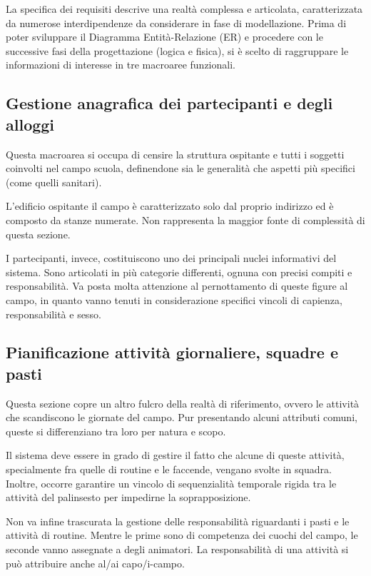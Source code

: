 \documentclass[11pt,a4paper]{article}
\begin{document}
La specifica dei requisiti descrive una realtà complessa e articolata, caratterizzata da
numerose interdipendenze da considerare in fase di modellazione. Prima di poter sviluppare il
Diagramma Entità-Relazione (ER) e procedere con le successive fasi della progettazione (logica
e fisica), si è scelto di raggruppare le informazioni di interesse in tre macroaree funzionali.

\subsection{Gestione anagrafica dei partecipanti e degli alloggi}

Questa macroarea si occupa di censire la struttura ospitante e tutti i soggetti coinvolti nel
campo scuola, definendone sia le generalità che aspetti più specifici (come quelli sanitari).

L'edificio ospitante il campo è caratterizzato solo dal proprio indirizzo ed è composto da
stanze numerate. Non rappresenta la maggior fonte di complessità di questa sezione.

I partecipanti, invece, costituiscono uno dei principali nuclei informativi del sistema. Sono
articolati in più categorie differenti, ognuna con precisi compiti e responsabilità. Va posta
molta attenzione al pernottamento di queste figure al campo, in quanto vanno tenuti in
considerazione specifici vincoli di capienza, responsabilità e sesso.

\subsection{Pianificazione attività giornaliere, squadre e pasti}

Questa sezione copre un altro fulcro della realtà di riferimento, ovvero le attività che
scandiscono le giornate del campo. Pur presentando alcuni attributi comuni, queste si
differenziano tra loro per natura e scopo.

Il sistema deve essere in grado di gestire il fatto che alcune di queste attività, specialmente
fra quelle di routine e le faccende, vengano svolte in squadra. Inoltre, occorre garantire un
vincolo di sequenzialità temporale rigida tra le attività del palinsesto per impedirne la soprapposizione.

Non va infine trascurata la gestione delle responsabilità riguardanti i pasti e le attività di
routine. Mentre le prime sono di competenza dei cuochi del campo, le seconde vanno assegnate a
degli animatori. La responsabilità di una attività si può attribuire anche al/ai capo/i-campo.
\end{document}
